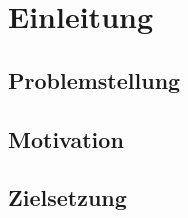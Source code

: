 
\chapter{Einleitung}\label{cha:Einleitung}

\section{Problemstellung}\label{sec:Problemstellung}

\section{Motivation}\label{sec:Motivation}

\section{Zielsetzung}\label{sec:Zielsetzung}